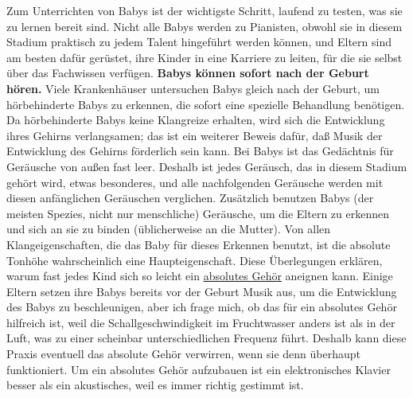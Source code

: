 Zum Unterrichten von Babys ist der wichtigste Schritt, laufend zu testen, was sie zu lernen bereit sind.
Nicht alle Babys werden zu Pianisten, obwohl sie in diesem Stadium praktisch zu jedem Talent hingeführt werden können, und Eltern sind am besten dafür gerüstet, ihre Kinder in eine Karriere zu leiten, für die sie selbst über das Fachwissen verfügen.
\textbf{Babys können sofort nach der Geburt hören.}
Viele Krankenhäuser untersuchen Babys gleich nach der Geburt, um hörbehinderte Babys zu erkennen, die sofort eine spezielle Behandlung benötigen.
Da hörbehinderte Babys keine Klangreize erhalten, wird sich die Entwicklung ihres Gehirns verlangsamen; das ist ein weiterer Beweis dafür, daß Musik der Entwicklung des Gehirns förderlich sein kann.
Bei Babys ist das Gedächtnis für Geräusche von außen fast leer.
Deshalb ist jedes Geräusch, das in diesem Stadium gehört wird, etwas besonderes, und alle nachfolgenden Geräusche werden mit diesen anfänglichen Geräuschen verglichen.
Zusätzlich benutzen Babys (der meisten Spezies, nicht nur menschliche) Geräusche, um die Eltern zu erkennen und sich an sie zu binden (üblicherweise an die Mutter).
Von allen Klangeigenschaften, die das Baby für dieses Erkennen benutzt, ist die absolute Tonhöhe wahrscheinlich eine Haupteigenschaft.
Diese Überlegungen erklären, warum fast jedes Kind sich so leicht ein \hyperref[c1iii12]{absolutes Gehör} aneignen kann.
Einige Eltern setzen ihre Babys bereits vor der Geburt Musik aus, um die Entwicklung des Babys zu beschleunigen, aber ich frage mich, ob das für ein absolutes Gehör hilfreich ist, weil die Schallgeschwindigkeit im Fruchtwasser anders ist als in der Luft, was zu einer scheinbar unterschiedlichen Frequenz führt.
Deshalb kann diese Praxis eventuell das absolute Gehör verwirren, wenn sie denn überhaupt funktioniert.
Um ein absolutes Gehör aufzubauen ist ein elektronisches Klavier besser als ein akustisches, weil es immer richtig gestimmt ist.

